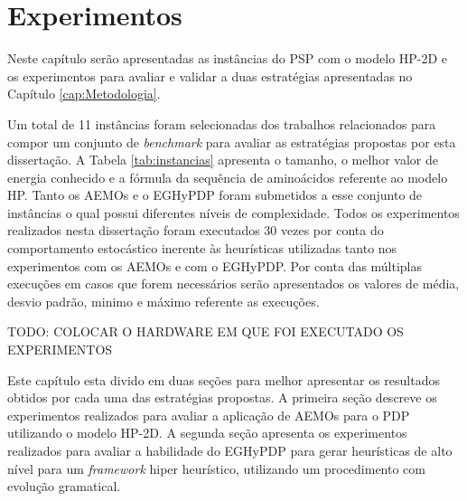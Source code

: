 \chapter{Experimentos}

Neste capítulo serão apresentadas as instâncias do PSP com o modelo HP-2D e os experimentos para avaliar e validar a duas estratégias apresentadas no Capítulo \ref{cap:Metodologia}.

Um  total de 11 instâncias foram selecionadas  dos trabalhos relacionados para compor um conjunto de \textit{benchmark} para avaliar as estratégias propostas por esta dissertação. A Tabela \ref{tab:instancias} apresenta o tamanho, o melhor valor de energia conhecido e a fórmula da sequência de aminoácidos referente ao modelo HP. Tanto os AEMOs e o EGHyPDP foram submetidos a esse conjunto de instâncias o qual possui diferentes níveis de complexidade. Todos os experimentos realizados nesta dissertação foram executados 30 vezes por conta do comportamento estocástico inerente às heurísticas utilizadas tanto nos experimentos com os AEMOs e com o EGHyPDP. Por conta das múltiplas execuções em casos que forem necessários serão apresentados os valores de média, desvio padrão, minimo e máximo referente as execuções.

TODO: COLOCAR O HARDWARE EM QUE FOI EXECUTADO OS EXPERIMENTOS


Este capítulo esta divido em duas seções para melhor apresentar os resultados obtidos por cada uma das estratégias propostas. A primeira seção descreve os experimentos realizados para avaliar a aplicação de AEMOs para o PDP utilizando o modelo HP-2D. A segunda seção apresenta os experimentos realizados para avaliar a habilidade do EGHyPDP para gerar heurísticas de alto nível para um \textit{framework} hiper heurístico, utilizando um procedimento com evolução gramatical.



